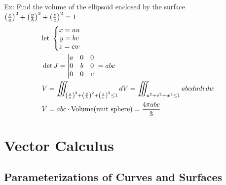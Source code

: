 \documentclass[11pt, fleqn]{article}
\begin{document}
Ex: Find the volume of the ellipsoid enclosed by the surface $\left( \frac{x}{a} \right)^2+\left( \frac{y}{b} \right)^2+\left( \frac{z}{c} \right)^2=1$
\begin{align*}
    &\text{let }\left\{\begin{matrix} x=au\\y=bv\\z=cw \end{matrix}\right.\\
    &\det J=\left|\begin{matrix} a&0&0\\0&b&0\\0&0&c \end{matrix}\right|=abc\\
    &V=\iiint_{\left( \frac{x}{a} \right)^2+\left( \frac{y}{b} \right)^2+\left( \frac{z}{c} \right)^2\leq1}dV=\iiint_{u^2+v^2+w^2\leq1}abcdudvdw\\
    &V=abc\cdot\text{Volume(unit sphere)}=\frac{4\pi abc}{3}
\end{align*}




































\section{Vector Calculus}
\subsection{Parameterizations of Curves and Surfaces}
\end{document}
